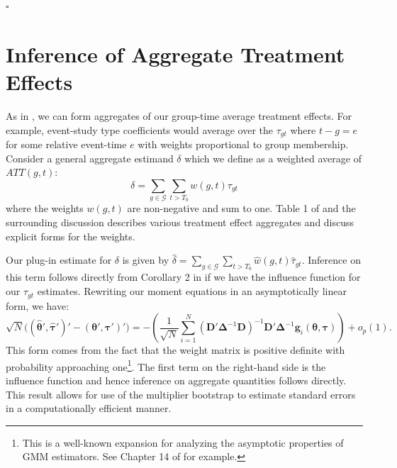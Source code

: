 \documentclass[12pt]{article}
\begin{document}
$\square$


\section{Inference of Aggregate Treatment Effects}

As in \citet{Callaway_Santanna_2021}, we can form aggregates of our group-time average treatment effects. For example, event-study type coefficients would average over the $\tau_{gt}$ where $t - g = e$ for some relative event-time $e$ with weights proportional to group membership. Consider a general aggregate estimand $\delta$ which we define as a weighted average of $ATT(g,t)$:
\begin{equation}
\delta = \sum_{g\in \mathcal{G}} \sum_{t > T_0} w(g,t) \tau_{gt}
\end{equation}
where the weights $w(g,t)$ are non-negative and sum to one. Table 1 of \citet{Callaway_Santanna_2021} and the surrounding discussion describes various treatment effect aggregates and discuss explicit forms for the weights. 

Our plug-in estimate for $\delta$ is given by $\hat{\delta} = \sum_{g\in \mathcal{G}} \sum_{t > T_0} \hat{w}(g,t) \hat{\tau}_{gt}$. Inference on this term follows directly from Corollary 2 in \citet{Callaway_Santanna_2021} if we have the influence function for our $\tau_{gt}$ estimates. Rewriting our moment equations in an asymptotically linear form, we have:
\begin{equation}
    \sqrt{N}\Big( (\widehat{\bm{\theta}}', \widehat{\bm \tau}')' - (\bm{\theta}', \bm \tau')' \Big) = - \left( \frac{1}{\sqrt{N}} \sum_{i = 1}^N (\bm D' \bm \Delta^{-1} \bm D)^{-1} \bm D' \bm \Delta^{-1} \bm g_i(\bm{\theta}, \bm \tau) \right) + o_p(1).
\end{equation}
This form comes from the fact that the weight matrix is positive definite with probability approaching one\footnote{This is a well-known expansion for analyzing the asymptotic properties of GMM estimators. See Chapter 14 of \citet{Wooldridge_2010} for example.}. The first term on the right-hand side is the influence function and hence inference on aggregate quantities follows directly. This result allows for use of the multiplier bootstrap to estimate standard errors in a computationally efficient manner.

\end{document}
